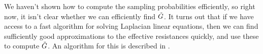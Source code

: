 We haven't shown how to compute the sampling probabilities
efficiently, so right now, it isn't clear whether we can efficiently
find $\tilde{G}$.
It turns out that if we have access to a fast algorithm for solving
Laplacian linear equations, then we can find sufficiently good
approximations to the effective resistances quickly, and use these to
compute $\tilde{G}$.
An algorithm for this is described in \cite{spielman2011graph}.




\FloatBarrier


